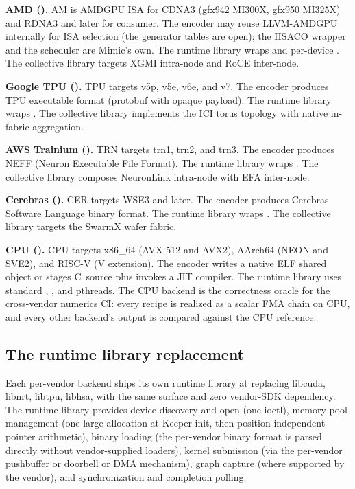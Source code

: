 \textbf{AMD ().}
AM is AMDGPU ISA for CDNA3 (gfx942 MI300X, gfx950 MI325X) and RDNA3 and later for consumer.
The encoder may reuse LLVM-AMDGPU internally for ISA selection (the generator tables are open); the HSACO wrapper and the scheduler are Mimic's own.
The runtime library wraps  and per-device .
The collective library targets XGMI intra-node and RoCE inter-node.

\textbf{Google TPU ().}
TPU targets v5p, v5e, v6e, and v7.
The encoder produces TPU executable format (protobuf with opaque payload).
The runtime library wraps .
The collective library implements the ICI torus topology with native in-fabric aggregation.

\textbf{AWS Trainium ().}
TRN targets trn1, trn2, and trn3.
The encoder produces NEFF (Neuron Executable File Format).
The runtime library wraps .
The collective library composes NeuronLink intra-node with EFA inter-node.

\textbf{Cerebras ().}
CER targets WSE3 and later.
The encoder produces Cerebras Software Language binary format.
The runtime library wraps .
The collective library targets the SwarmX wafer fabric.

\textbf{CPU ().}
CPU targets x86\_64 (AVX-512 and AVX2), AArch64 (NEON and SVE2), and RISC-V (V extension).
The encoder writes a native ELF shared object or stages C\nolinebreak\hspace{0.05em}\raisebox{0.4ex}{\tiny ++}\, source plus invokes a JIT compiler.
The runtime library uses standard , , and pthreads.
The CPU backend is the correctness oracle for the cross-vendor numerics CI: every  recipe is realized as a scalar FMA chain on CPU, and every other backend's output is compared against the CPU reference.

\subsection{The runtime library replacement}
\label{sec:mimic-runtime}

Each per-vendor backend ships its own runtime library at  replacing libcuda, libnrt, libtpu, libhsa, with the same surface and zero vendor-SDK dependency.
The runtime library provides device discovery and open (one ioctl), memory-pool management (one large allocation at Keeper init, then position-independent pointer arithmetic), binary loading (the per-vendor binary format is parsed directly without vendor-supplied loaders), kernel submission (via the per-vendor pushbuffer or doorbell or DMA mechanism), graph capture (where supported by the vendor), and synchronization and completion polling.

